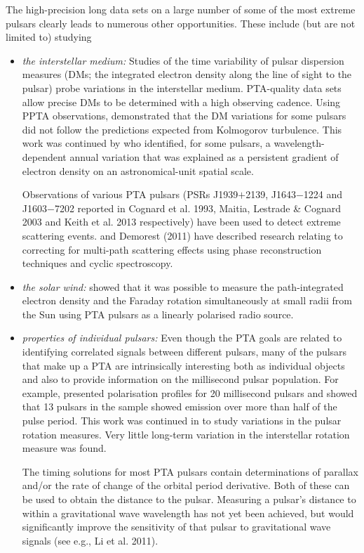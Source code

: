 \documentclass{raa}            %
\begin{document}
The high-precision long data sets on a large number of some of the most extreme pulsars clearly leads to numerous other opportunities.  These include (but are not limited to) studying
\begin{itemize}
\item \emph{the interstellar medium:} Studies of the time variability of pulsar dispersion measures (DMs; the integrated electron density along the line of sight to the pulsar) probe variations in the interstellar medium.  PTA-quality data sets allow precise DMs to be determined with a high observing cadence.  Using PPTA observations, \cite{yhc+07a} demonstrated that the DM variations for some pulsars did not follow the predictions expected from Kolmogorov turbulence.  This work was continued by \cite{kcs+13} who identified, for some pulsars, a wavelength-dependent annual variation that was explained as a persistent gradient of electron density on an astronomical-unit spatial scale.  

 Observations of various PTA pulsars (PSRs J1939$+$2139, J1643$-$1224 and J1603$-$7202 reported in Cognard et al. 1993\nocite{cbl+93}, Maitia, Lestrade \& Cognard 2003 and Keith et al. 2013\nocite{kcs+13} respectively) have been used to detect extreme scattering events.  \cite{sti13} and Demorest (2011) have described research relating to correcting for multi-path scattering effects using phase reconstruction techniques and cyclic spectroscopy.

\item \emph{the solar wind: } \cite{ychm12} showed that it was possible to measure the path-integrated electron density and the Faraday rotation simultaneously at small radii from the Sun using PTA pulsars as a linearly polarised radio source.

\item \emph{properties of individual pulsars:} Even though the PTA goals are related to identifying correlated signals between different pulsars, many of the pulsars that make up a PTA are intrinsically interesting both as individual objects and also to provide information on the millisecond pulsar population.  For example, \cite{ymc+11} presented polarisation profiles for 20 millisecond pulsars and showed that 13 pulsars in the sample showed emission over more than half of the pulse period.  This work was continued in \cite{ymh+11} to study variations in the pulsar rotation measures.  Very little long-term variation in the interstellar rotation measure was found.

The timing solutions for most PTA pulsars contain determinations of parallax and/or the rate of change of the orbital period derivative.  Both of these can be used to obtain the distance to the pulsar.  Measuring a pulsar's distance to within a gravitational wave wavelength has not yet been achieved, but would significantly improve the sensitivity of that pulsar to gravitational wave signals (see e.g., Li et al. 2011\nocite{lwk+11}). 


\end{itemize}
\end{document}

